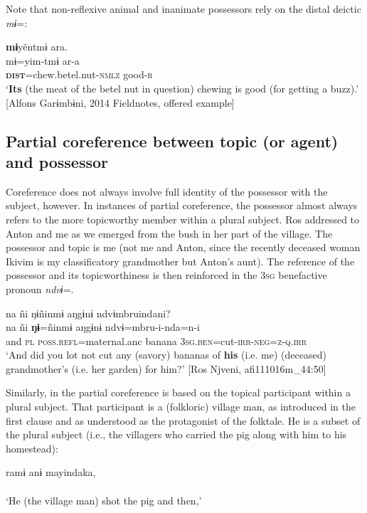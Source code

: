 \documentclass[output=paper]{langscibook}
\begin{document}
Note that non-reflexive animal and inanimate possessors rely on the distal deictic \textit{mɨ}=:

\ea\label{ex:brooks:17}
\glll \textbf{mɨ}yẽntmɨ ara.\\
mɨ=yim-tmɨ ar-a\\
\textbf{\textsc{dist}}=chew.betel.nut\textsc{-nmlz}  good\textsc{-r}\\
\glt `\textbf{Its} (the meat of the betel nut in question) chewing is good (for getting a buzz).'
[Alfons Garɨmbɨni, 2014 Fieldnotes, offered example]
\z


\subsection{{Partial} {coreference} {between} {topic} {(or} {agent)} {and} {possessor}}\label{sec:brooks:3.2}

Coreference does not always involve full identity of the possessor with the subject, however. In instances of partial coreference, the possessor almost always refers to the more topicworthy member within a plural subject. Ros addressed  to Anton and me as we emerged from the bush in her part of the village. The possessor and topic is me (not me and Anton, since the recently deceased woman Ikivim is my classificatory grandmother but Anton's aunt). The reference of the possessor and its topicworthiness is then reinforced in the 3\textsc{sg} benefactive pronoun \textit{ndvɨ}=.

\ea\label{ex:brooks:18}
\glll na  ñi   ŋɨñinmɨ   aŋgɨnɨ ndvɨmbruindani?\\
 na  ñi \textbf{ŋɨ}=ñinmɨ aŋgɨnɨ ndvɨ=mbru-i-nda=n-i\\
and  \textsc{pl}   \textsc{poss.refl}=maternal.anc banana \textsc{3sg.ben}=cut-\textsc{irr-neg=z-q.irr}\\
\glt `And did you lot not cut any (savory) bananas of \textbf{his} (i.e. me) (deceased) grandmother’s (i.e. her garden) for him?' [Ros Njveni, afi111016m\_44:50]
\z


Similarly, in  the partial coreference is based on the topical participant within a plural subject. That participant is a (folkloric) village man, as introduced in the first clause and as understood as the protagonist of the folktale. He is a subset of the plural subject (i.e., the villagers who carried the pig along with him to his homestead):

\ea\label{ex:brooks:19}
\gll ramɨ anɨ mayindaka,\\ \\
 \glt `He (the village man) shot the pig and then,'
\end{document}
